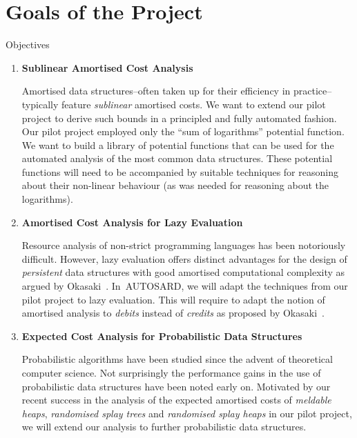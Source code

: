 \documentclass[
11pt,
usepdftitle=false,
aspectratio=169,
xcolor={table,usenames,dvipsnames},
handout,
]{beamer}
\newenvironment{mybox}[1]{\begin{block}{#1}}{\end{block}}
\begin{document}
\section{Goals of the Project}
\begin{frame}

  \begin{mybox}{Objectives}
    \begin{enumerate}
    \item \textbf{Sublinear Amortised Cost Analysis}
      
      Amortised data structures--often taken up for their efficiency in practice--typically feature \emph{sublinear} amortised costs.
      We want to extend our pilot project to derive such bounds in a principled and fully automated fashion.
      Our pilot project employed only the ``sum of logarithms'' potential function.
      We want to build a library of potential functions that can be used for the automated analysis of the most common data structures.
      These potential functions will need to be accompanied by suitable techniques for reasoning about their non-linear behaviour (as was needed for reasoning about the logarithms).

      \smallskip
      
    \item \textbf{Amortised Cost Analysis for Lazy Evaluation}

      Resource analysis of non-strict programming languages has been notoriously difficult.
      However, lazy evaluation offers distinct advantages for the design of \emph{persistent} data structures with good amortised computational complexity as argued by Okasaki~\cite{Okasaki:1999}.
      In~AUTOSARD, we will adapt the techniques from our pilot project to lazy evaluation.
      This will require to adapt the notion of amortised analysis to \emph{debits} instead of \emph{credits} as proposed by Okasaki~\cite{Okasaki:1999}.
      
      \smallskip
    \item \textbf{Expected Cost Analysis for Probabilistic Data Structures}

      Probabilistic algorithms have been studied since the advent of theoretical computer science.
Not surprisingly the performance
gains in the use of probabilistic data structures have been noted early on.
Motivated by our recent success in the analysis of the expected amortised
costs of \emph{meldable heaps}, \emph{randomised splay trees} and \emph{randomised splay heaps} in our pilot project,
we will extend our analysis to further probabilistic data structures.

    \end{enumerate}
  \end{mybox}
\end{frame}
\end{document}
